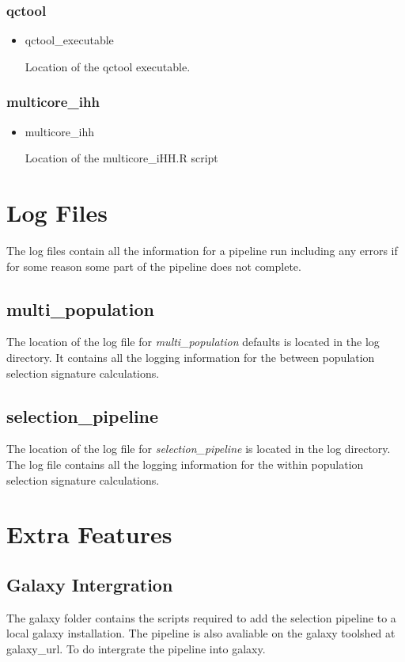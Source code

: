 \documentclass[a4paper,10pt]{article}
\begin{document}
\subsubsection{qctool}
\begin{itemize}
\item qctool\_executable

Location of the qctool executable.
\end{itemize}
\subsubsection{multicore\_ihh}
\begin{itemize}
\item multicore\_ihh

Location of the multicore\_iHH.R script



\end{itemize}
\section{Log Files}
The log files contain all the information for a pipeline run including any errors if for some reason some part of the pipeline does not complete.
\subsection{multi\_population}
The location of the log file for  \emph{multi\_population} defaults is
located in the log directory. It contains all the logging information
for the between population selection signature calculations.

\subsection{selection\_pipeline}
The location of the log file for \emph{selection\_pipeline} is located
in the log directory. The log file contains all the logging
information for the within population selection signature
calculations.

\section{Extra Features}

\subsection{Galaxy Intergration}
The galaxy folder contains the scripts required to add the selection
pipeline to a local galaxy installation. The pipeline is also
avaliable on the galaxy toolshed at galaxy\_url. To do intergrate the
pipeline into galaxy.
\end{document}
